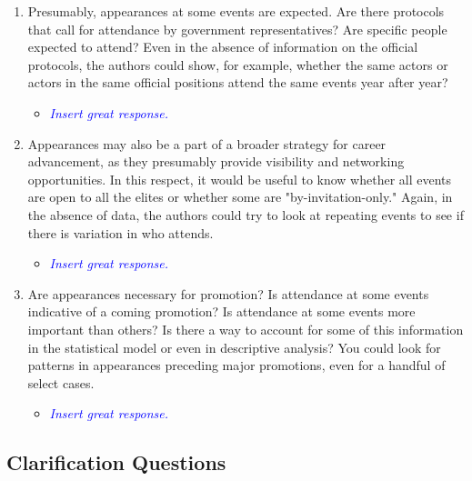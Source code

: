 \begin{enumerate}
 \item Presumably, appearances at some events are expected. Are there protocols that call for attendance by government representatives? Are specific people expected to attend?  Even in the absence of information on the official protocols, the authors could show, for example, whether the same actors or actors in the same official positions attend the same events year after year?
	\begin{itemize}
		\item \textcolor{blue}{ \emph{
			Insert great response.
		}}
	\end{itemize}
	\item Appearances may also be a part of a broader strategy for career advancement, as they presumably provide visibility and networking opportunities. In this respect, it would be useful to know whether all events are open to all the elites or whether some are "by-invitation-only."  Again, in the absence of data, the authors could try to look at repeating events to see if there is variation in who attends.
	\begin{itemize}
		\item \textcolor{blue}{ \emph{
			Insert great response.
		}}
	\end{itemize}
	\item Are appearances necessary for promotion? Is attendance at some events indicative of a coming promotion? Is attendance at some events more important than others? Is there a way to account for some of this information in the statistical model or even in descriptive analysis? You could look for patterns in appearances preceding major promotions, even for a handful of select cases.
	\begin{itemize}
		\item \textcolor{blue}{ \emph{
			Insert great response.
		}}
	\end{itemize}
\end{enumerate}

\subsection*{Clarification Questions}


